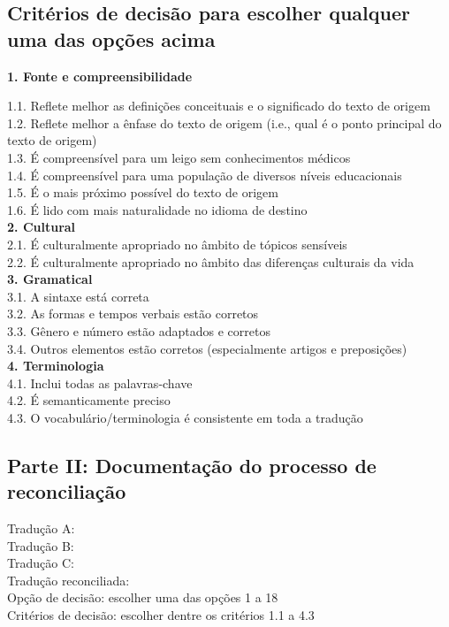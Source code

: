 \documentclass[
  ,doc,11pt, twoside,floatsintext]{apa6}
\begin{document}
\begin{appendix}
\begin{flushleft}
\subsection{Critérios de decisão para escolher qualquer uma das opções acima}

\textbf{1.	Fonte e compreensibilidade}

1.1.	 Reflete melhor as definições conceituais e o significado do texto de origem\\
1.2.	 Reflete melhor a ênfase do texto de origem (i.e., qual é o ponto principal do texto de origem)\\
1.3.	 É compreensível para um leigo sem conhecimentos médicos\\
1.4.	 É compreensível para uma população de diversos níveis educacionais\\
1.5.	 É o mais próximo possível do texto de origem\\
1.6.	 É lido com mais naturalidade no idioma de destino\\
\textbf{2.	Cultural}\\
2.1.	 É culturalmente apropriado no âmbito de tópicos sensíveis\\
2.2.	 É culturalmente apropriado no âmbito das diferenças culturais da vida\\
\textbf{3.	Gramatical}\\
3.1.	 A sintaxe está correta\\
3.2.	 As formas e tempos verbais estão corretos\\
3.3.	 Gênero e número estão adaptados e corretos\\
3.4.	 Outros elementos estão corretos (especialmente artigos e preposições)\\
\textbf{4.	Terminologia}\\
4.1.	 Inclui todas as palavras-chave\\
4.2.	 É semanticamente preciso\\
4.3.	 O vocabulário/terminologia é consistente em toda a tradução\\

\subsection{Parte II: Documentação do processo de reconciliação}

Tradução A:\\
Tradução B:\\
Tradução C:\\
Tradução reconciliada:\\
Opção de decisão: escolher uma das opções 1 a 18\\
Critérios de decisão: escolher dentre os critérios 1.1 a 4.3
\end{flushleft}
\end{appendix}
\end{document}
